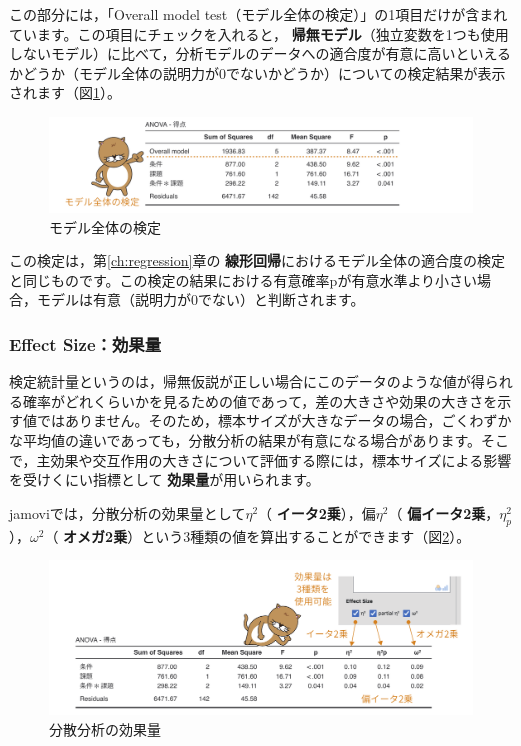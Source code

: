 \documentclass[
  12pt,
  a5jpaper,
  lualatex, ja=standard]{bxjsbook}
\renewcommand{\emph}[1]{\textbf{\color{emph} #1}}
\begin{document}
この部分には，「Overall model test（モデル全体の検定）」の1項目だけが含まれています。この項目にチェックを入れると，\emph{帰無モデル}（独立変数を1つも使用しないモデル）に比べて，分析モデルのデータへの適合度が有意に高いといえるかどうか（モデル全体の説明力が0でないかどうか）についての検定結果が表示されます（図\ref{fig:ANOVA-anova-overalltest}）。

\begin{figure}[!ht]

{\centering \includegraphics[width=1\linewidth]{images/ANOVA/anova-overalltest} 

}

\caption{モデル全体の検定}\label{fig:ANOVA-anova-overalltest}
\end{figure}

この検定は，第\ref{ch:regression}章の\emph{線形回帰}におけるモデル全体の適合度の検定と同じものです。この検定の結果における有意確率pが有意水準より小さい場合，モデルは有意（説明力が0でない）と判断されます。

\hypertarget{effect-sizeux52b9ux679cux91cf-1}{%
\subsubsection*{Effect Size：効果量}\label{effect-sizeux52b9ux679cux91cf-1}}

検定統計量というのは，帰無仮説が正しい場合にこのデータのような値が得られる確率がどれくらいかを見るための値であって，差の大きさや効果の大きさを示す値ではありません。そのため，標本サイズが大きなデータの場合，ごくわずかな平均値の違いであっても，分散分析の結果が有意になる場合があります。そこで，主効果や交互作用の大きさについて評価する際には，標本サイズによる影響を受けくにい指標として\emph{効果量}が用いられます。

jamoviでは，分散分析の効果量として\(\eta^2\)（\emph{イータ2乗}），偏\(\eta^2\)（\emph{偏イータ2乗}，\(\eta^2_p\)），\(\omega^2\)（\emph{オメガ2乗}）という3種類の値を算出することができます（図\ref{fig:ANOVA-anova-es}）。

\begin{figure}[!ht]

{\centering \includegraphics[width=1\linewidth]{images/ANOVA/anova-es} 

}

\caption{分散分析の効果量}\label{fig:ANOVA-anova-es}
\end{figure}
\end{document}
